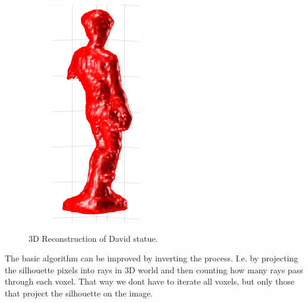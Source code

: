 \documentclass[paper=a4, fontsize=11pt]{scrartcl} %
\numberwithin{equation}{section} %
\numberwithin{figure}{section} %
\numberwithin{table}{section} %
\begin{document}
\begin{figure}
\begin{subfigure}{.3\textwidth}
\end{subfigure}
\begin{subfigure}{.3\textwidth}
  \centering
  \includegraphics[width=0.9\linewidth]{david_3.png}
\end{subfigure}
\caption{3D Reconstruction of David statue.}
\label{fig:scrs}
\end{figure}

The basic algorithm can be improved by inverting the process. I.e. by projecting the silhouette pixels into rays in 3D world and then counting how many rays pass through each voxel. That way we dont have to iterate all voxels, but only those that project the silhouette on the image.
\end{document}
